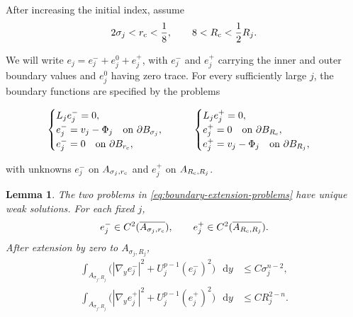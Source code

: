 \documentclass[11pt]{article}
\numberwithin{equation}{section}
\newtheorem{lemma}[theorem]{Lemma}
\theoremstyle{remark}
\newcommand{\dd}{\mathop{}\!\mathrm{d}}
\begin{document}
\par
\par
After increasing the initial index, assume
\begin{equation}\label{eq:boundary-region-separation}
 2\sigma_j<r_{\rm c}<\frac18,
 \qquad 8<R_{\rm c}<\frac12R_j.
\end{equation}

\par
We will write \(e_j=e_j^-+e_j^0+e_j^+\), with \(e_j^-\) and \(e_j^+\)
carrying the inner and outer boundary values and \(e_j^0\) having zero
trace. For every sufficiently large \(j\), the boundary functions are
specified by the problems
 
\begin{equation}\label{eq:boundary-extension-problems}
 \begin{cases}
  L_je_j^-=0,\\
 e_j^-=v_j-\Phi_j\quad\text{on }\partial B_{\sigma_j},\\
 e_j^-=0\quad\text{on }\partial B_{r_{\rm c}},
 \end{cases}
 \qquad
 \begin{cases}
  L_je_j^+=0,\\
 e_j^+=0\quad\text{on }\partial B_{R_{\rm c}},\\
 e_j^+=v_j-\Phi_j\quad\text{on }\partial B_{R_j},
 \end{cases}
\end{equation}

with unknowns \(e_j^-\) on \(A_{\sigma_j,r_{\rm c}}\) and \(e_j^+\) on
\(A_{R_{\rm c},R_j}\).

\begin{lemma}\label{lem:boundary-extensions}
The two problems in \eqref{eq:boundary-extension-problems} have unique weak
solutions.
For each fixed \(j\),
\[
 e_j^-\in C^2(\overline{A_{\sigma_j,r_{\rm c}}}),
 \qquad
 e_j^+\in C^2(\overline{A_{R_{\rm c},R_j}}).
\]
After extension by zero to \(A_{\sigma_j,R_j}\),
\begin{equation}\label{eq:boundary-extension-energy}
 \begin{aligned}
 \int_{A_{\sigma_j,R_j}}\bigl(|\nabla_ye_j^-|^2
 +U_j^{p-1}(e_j^-)^2\bigr)\,\dd y
 &\le C\sigma_j^{n-2},\\
 \int_{A_{\sigma_j,R_j}}\bigl(|\nabla_ye_j^+|^2
 +U_j^{p-1}(e_j^+)^2\bigr)\,\dd y
 &\le CR_j^{2-n}.
 \end{aligned}
\end{equation}
\end{lemma}
\end{document}
